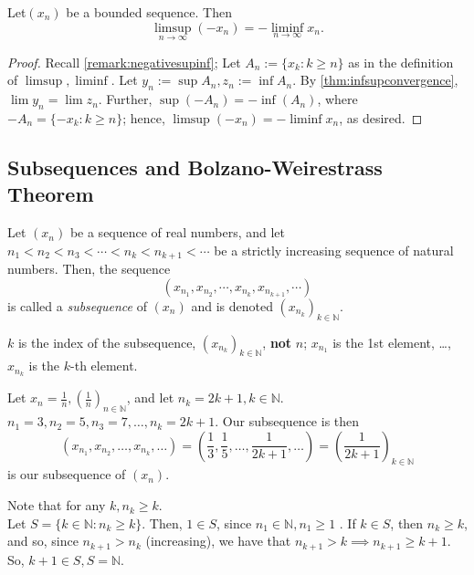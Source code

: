 \documentclass[12pt]{article}
\begin{document}
\begin{example}
  Let\footnotemark $(x_n)$ be a bounded sequence. Then \[\limsup_{n\to\infty} (-x_n) = - \liminf_{n \to \infty} x_n.\]
\end{example}
\begin{proof}
  Recall \cref{remark:negativesupinf}; Let $A_n := \{x_k : k \geq n\}$ as in the definition of $\limsup, \liminf$. Let $y_n:=\sup A_n, z_n := \inf A_n$. By \cref{thm:infsupconvergence}, $\lim y_n = \lim z_n$. Further, $\sup (- A_n) = - \inf (A_n)$, where $-A_n = \{-x_k : k \geq n\}$; hence, $\limsup (-x_n) = -\liminf x_n$, as desired.
\end{proof}



\subsection{Subsequences and Bolzano-Weirestrass Theorem}

\begin{definition}[Subsequence]
  Let $(x_n)$ be a sequence of real numbers, and let $n_1 < n_2 < n_3 <\cdots < n_k < n_{k+1} < \cdots$ be a strictly increasing sequence of natural numbers. Then, the sequence \[(x_{n_1}, x_{n_2}, \cdots, x_{n_k}, x_{n_{k+1}} , \cdots )\] is called a \emph{subsequence} of $(x_n)$ and is denoted $(x_{n_k})_{k \in \mathbb{N}}$.
\end{definition}

\begin{remark}
  $k$ is the index of the subsequence, $(x_{n_k})_{k\in\mathbb{N}}$, \textbf{not} $n$; $x_{n_1}$ is the 1st element, \dots, $x_{n_k}$ is the $k$-th element.
\end{remark}

\begin{example}
  Let $x_{n} = \frac{1}{n}, (\frac{1}{n})_{n\in\mathbb{N}}$, and let $n_k = 2k+1, k \in \mathbb{N}$. $n_1 =3, n_2 = 5, n_3 = 7, \dots, n_k = 2k+1$. Our subsequence is then \[(x_{n_1}, x_{n_2}, \dots, x_{n_k}, \dots) = \left(\frac{1}{3}, \frac{1}{5}, \dots, \frac{1}{2k+1}, \dots\right) = \left(\frac{1}{2k+1}\right)_{k\in\mathbb{N}}\]is our subsequence of $(x_n)$.
\end{example}

\begin{remark}\label{remark:nkgeqk}
  Note that for any $k, n_{k} \geq k$.\\ Let $S = \{k \in \mathbb{N} : n_k \geq k\}$. Then, $1 \in S$, since $n_1 \in \mathbb{N}, n_1 \geq 1$ . If $k \in S$, then $n_k \geq k$, and so, since $n_{k+1} > n_k$ (increasing), we have that $n_{k+1}> k \implies n_{k+1} \geq k+1$. So, $k+1 \in S, S= \mathbb{N}$.
\end{remark}
\end{document}
